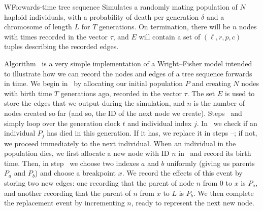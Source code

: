 \documentclass{article}
\begin{document}
\begin{taocpalg}{W}{Forwards-time tree sequence}
{Simulates a randomly mating population of $N$ haploid individuals,
with a probability of death per generation $\delta$ and a chromosome of length
$L$ for $T$ generations. On termination, there will be $n$ nodes with times recorded
in the vector $\tau$, and $E$ will contain a set of $(\ell, r, p, c)$ tuples
describing the recorded edges.
}




\algstep{W4.}{Mortality.}{ If $\randomuniform([0, 1)) \geq \delta$ go to \algref{W8}.
}


\algstep{W6.}{Choose parents.}{Set $a \leftarrow \randomuniform(\{0, \dots, N - 1\})$,
    $b \leftarrow \randomuniform(\{0, \dots, N - 1\})$ and $x \leftarrow \randomuniform([0, L))$.
}



\end{taocpalg}

Algorithm~ is a very simple implementation of a Wright--Fisher model
intended to illustrate how we can record the nodes and edges of a tree sequence
forwards in time. We begin in~ by allocating our initial population $P$
and creating $N$ nodes with birth time $T$ generations ago, recorded in the
vector $\tau$. The set $E$ is used to store the edges that we output during the
simulation, and $n$ is the number of nodes created so far (and so, the ID of
the next node we create). Steps~ and~ simply loop over
the generation clock $t$ and individual index $j$. In~ we check if
an individual $P_j$ has died in this generation. If it has, we replace it in
steps --; if not, we proceed immediately to the next
individual. When an individual in the population dies, we first allocate
a new node with ID $n$ in~ and record its birth time. Then,
in step~ we choose two indexes $a$ and $b$ uniformly (giving us
parents $P_a$ and $P_b$) and choose a breakpoint $x$. We record the effects of this
event by storing two new edges: one recording that the parent of node $n$
from $0$ to $x$ is $P_a$, and another recording that the parent of $n$
from $x$ to $L$ is $P_b$. We then complete the replacement event by incrementing
$n$, ready to represent the next new node.
\end{document}
